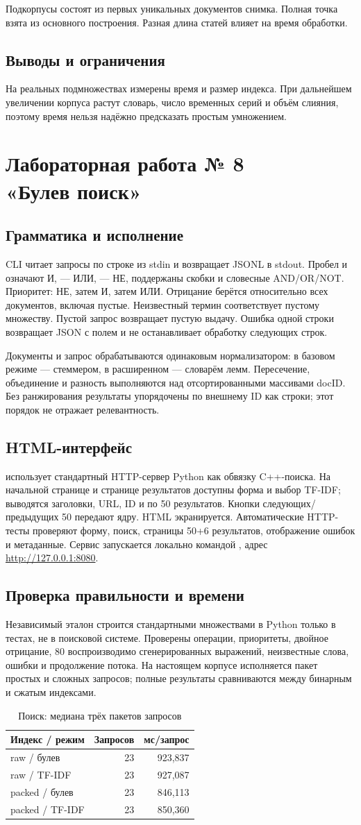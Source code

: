 \documentclass[12pt,a4paper]{article}
\newcommand{\code}[1]{\texttt{\detokenize{#1}}}
\newcommand{\sub}[1]{\subsection{#1}}
\begin{document}
Подкорпусы состоят из первых уникальных документов снимка. Полная точка взята из основного построения. Разная длина статей влияет на время обработки.


\sub{Выводы и ограничения}
На реальных подмножествах измерены время и размер индекса. При дальнейшем увеличении корпуса растут словарь, число временных серий и объём слияния, поэтому время нельзя надёжно предсказать простым умножением.
\section{Лабораторная работа № 8\\«Булев поиск»}
\sub{Грамматика и исполнение}
CLI читает запросы по строке из stdin и возвращает JSONL в stdout. Пробел и \code{&&} означают И, \code{||} --- ИЛИ, \code{!} --- НЕ, поддержаны скобки и словесные AND/OR/NOT. Приоритет: НЕ, затем И, затем ИЛИ. Отрицание берётся относительно всех документов, включая пустые. Неизвестный термин соответствует пустому множеству. Пустой запрос возвращает пустую выдачу. Ошибка одной строки возвращает JSON с полем \code{error} и не останавливает обработку следующих строк.

Документы и запрос обрабатываются одинаковым нормализатором: в базовом режиме --- стеммером, в расширенном --- словарём лемм. Пересечение, объединение и разность выполняются над отсортированными массивами docID. Без ранжирования результаты упорядочены по внешнему ID как строки; этот порядок не отражает релевантность.
\sub{HTML-интерфейс}
\code{lab08/web.py} использует стандартный HTTP-сервер Python как обвязку C++-поиска. На начальной странице и странице результатов доступны форма и выбор TF-IDF; выводятся заголовки, URL, ID и по 50 результатов. Кнопки следующих/предыдущих 50 передают \code{--offset} ядру. HTML экранируется. Автоматические HTTP-тесты проверяют форму, поиск, страницы 50+6 результатов, отображение ошибок и метаданные. Сервис запускается локально командой \code{python lab08/web.py}, адрес \url{http://127.0.0.1:8080}.
\sub{Проверка правильности и времени}
Независимый эталон строится стандартными множествами в Python только в тестах, не в поисковой системе. Проверены операции, приоритеты, двойное отрицание, 80 воспроизводимо сгенерированных выражений, неизвестные слова, ошибки и продолжение потока. На настоящем корпусе исполняется пакет простых и сложных запросов; полные результаты сравниваются между бинарным и сжатым индексами.

\begin{table}[H]\centering\small
\caption{Поиск: медиана трёх пакетов запросов}
\begin{tabularx}{\linewidth}{|X|r|r|}\hline
Индекс / режим & Запросов & мс/запрос \\\hline
raw / булев & 23 & 923,837 \\\hline
raw / TF-IDF & 23 & 927,087 \\\hline
packed / булев & 23 & 846,113 \\\hline
packed / TF-IDF & 23 & 850,360 \\\hline
\end{tabularx}\end{table}
\end{document}
